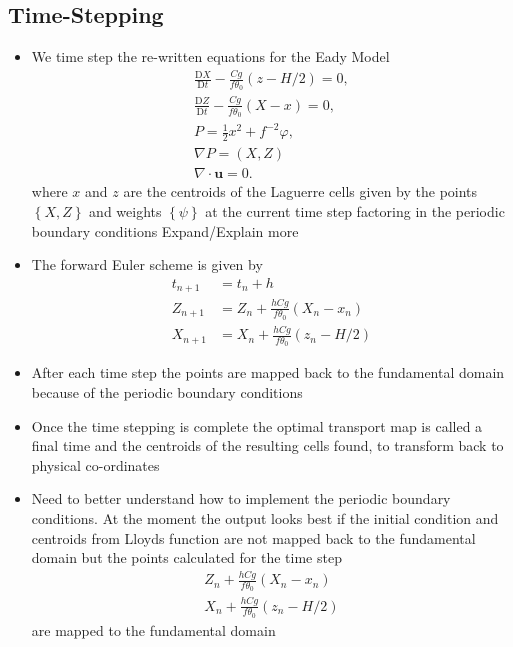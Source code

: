 \documentclass[]{article}
\begin{document}
 	\subsection{Time-Stepping}
 	\begin{itemize}
 		\item We time step the re-written equations for the Eady Model \cite{Cullen2008}
 		\begin{align*}
 		\frac{\textrm{D}X}{\textrm{D}t} - \frac{Cg}{f\theta_0}\left(z-H/2\right) = 0,
 		\\
 		\frac{\textrm{D}Z}{\textrm{D}t} - \frac{Cg}{f\theta_0}\left(X-x\right) = 0,
 		\\
 		P = \frac{1}{2}x^2 + f^{-2}\varphi,
 		\\
 		\nabla P = (X,Z)
 		\\
 		\nabla \cdot \bm{u} =0.
 		\end{align*}
 	where $x$ and $z$ are the centroids of the Laguerre cells given by the points $\left\lbrace X,Z\right\rbrace $ and weights $\left\lbrace \psi \right\rbrace $ at the current time step factoring in the periodic boundary conditions \color{red} Expand/Explain more \color{black}
 	\item The forward Euler scheme is given by 
 	\begin{align*}
 		t_{n+1} &= t_n + h\\
 		Z_{n+1} &= Z_n + \frac{hCg}{f\theta_0}\left(X_n-x_n\right)\\
 		X_{n+1} &= X_n + \frac{hCg}{f\theta_0}\left(z_n-H/2\right)
 	\end{align*}
 	\item After each time step the points are mapped back to the fundamental domain because of the periodic boundary conditions
 	\item Once the time stepping is complete the optimal transport map is called a final time and the centroids of the resulting cells found, to transform back to physical co-ordinates
 	\item \color{red} Need to better understand how to implement the periodic boundary conditions. At the moment the output looks best if the initial condition and centroids from Lloyds function are not mapped back to the fundamental domain but the points calculated for the time step  
 	\begin{align*}
 	Z_n + \frac{hCg}{f\theta_0}\left(X_n-x_n\right)\\
 	X_n + \frac{hCg}{f\theta_0}\left(z_n-H/2\right)
 	\end{align*}
 	are mapped to the fundamental domain
 	\end{itemize}
\end{document}
